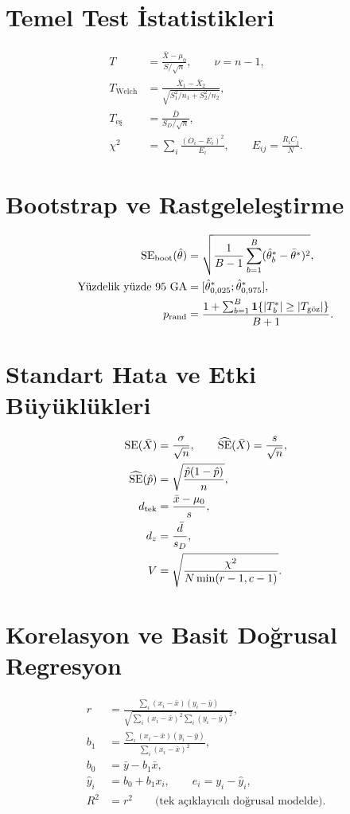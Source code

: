 \section{Temel Test İstatistikleri}
\begin{align*}
T &= \frac{\bar{X}-\mu_0}{S/\sqrt{n}}, \qquad \nu=n-1, \\
T_{\text{Welch}} &= \frac{\bar X_1-\bar X_2}
{\sqrt{S_1^2/n_1+S_2^2/n_2}}, \\
T_{\text{eş}} &= \frac{\bar D}{S_D/\sqrt n}, \\
\chi^2 &= \sum_i \frac{(O_i-E_i)^2}{E_i},
\qquad E_{ij}=\frac{R_iC_j}{N}.
\end{align*}

\ifimoders\else
\section{Bootstrap ve Rastgeleleştirme}
\begin{align*}
\operatorname{SE}_{\mathrm{boot}}(\hat\theta)
&=\sqrt{\frac{1}{B-1}\sum_{b=1}^{B}
(\hat\theta_b^*-\bar\theta^*)^2}, \\
\text{Yüzdelik yüzde 95 GA}
&=[\hat\theta^*_{0{,}025};\hat\theta^*_{0{,}975}], \\
p_{\mathrm{rand}}
&=\frac{1+\sum_{b=1}^{B}\mathbf{1}\!\left\{|T_b^*|\geq|T_{\text{göz}}|\right\}}{B+1}.
\end{align*}
\fi

\section{Standart Hata ve Etki Büyüklükleri}
\begin{align*}
\operatorname{SE}(\bar X) &= \frac{\sigma}{\sqrt n}, \qquad
\widehat{\operatorname{SE}}(\bar X)=\frac{s}{\sqrt n}, \\
\widehat{\operatorname{SE}}(\hat p) &= \sqrt{\frac{\hat p(1-\hat p)}{n}}, \\
d_{\mathrm{tek}} &= \frac{\bar x-\mu_0}{s}, \\
d_z &= \frac{\bar d}{s_D}, \\
V &= \sqrt{\frac{\chi^2}{N\min(r-1,c-1)}}.
\end{align*}

\section{Korelasyon ve Basit Doğrusal Regresyon}
\begin{align*}
r &= \frac{\sum_i(x_i-\bar{x})(y_i-\bar{y})}
{\sqrt{\sum_i(x_i-\bar{x})^2\sum_i(y_i-\bar{y})^2}}, \\
b_1 &= \frac{\sum_i (x_i-\bar{x})(y_i-\bar{y})}{\sum_i (x_i-\bar{x})^2}, \\
b_0 &= \bar{y}-b_1\bar{x}, \\
\hat y_i &= b_0+b_1x_i, \qquad e_i=y_i-\hat y_i, \\
R^2 &= r^2 \qquad \text{(tek açıklayıcılı doğrusal modelde)}.
\end{align*}

